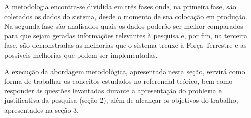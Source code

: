 A metodologia encontra-se dividida em três fases onde, na primeira fase, são coletados os dados do sistema, desde o momento de sua colocação em produção. Na segunda fase são analisados quais os dados poderão ser melhor comparados para que sejam geradas informações relevantes à pesquisa e, por fim, na terceira fase, são demonstradas as melhorias que o sistema trouxe à Força Terrestre e as possíveis melhorias que podem ser implementadas.

A execução da abordagem metodológica, apresentada nesta seção, servirá como forma de trabalhar os conceitos estudados no referencial teórico, bem como responder às questões levantadas durante a apresentação do problema e justificativa da pesquisa (seção 2), além de alcançar os objetivos do trabalho, apresentados na seção 3.


